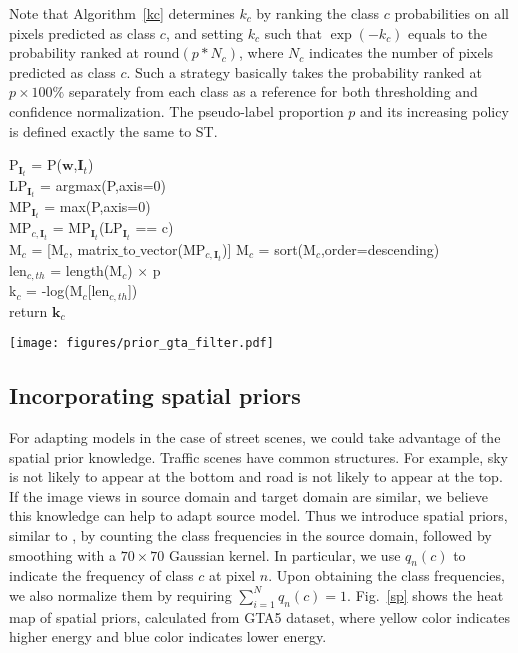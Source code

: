 \documentclass[runningheads]{llncs}
\begin{document}
Note that Algorithm~\ref{kc} determines $k_c$ by ranking the class $c$ probabilities on all pixels predicted as class $c$, and setting $k_c$ such that $\exp(-k_c)$ equals to the probability ranked at $\mathrm{round}(p*N_c)$, where $N_c$ indicates the number of pixels predicted as class $c$. Such a strategy basically takes the probability ranked at $p\times 100\%$ separately from each class as a reference for both thresholding and confidence normalization. The pseudo-label proportion $p$ and its increasing policy is defined exactly the same to ST.

\begin{algorithm}
	
	{ P$_{\textbf{I}_t}$ = P($\textbf{w}$,$\textbf{I}_t$) \\
		LP$_{\textbf{I}_t}$ = argmax(P,axis=0) \\
		MP$_{\textbf{I}_t}$ = max(P,axis=0) \\
		{
			MP$_{c,\textbf{I}_t}$ = MP$_{\textbf{I}_t}$(LP$_{\textbf{I}_t}$ == c) \\
			M$_c$ = [M$_c$, matrix$\_$to$\_$vector(MP$_{c,\textbf{I}_t}$)]
		}
	}
	{
		M$_c$ = sort(M$_c$,order=descending)\\
		len$_{c,th}$ = length(M$_c$) $\times$ p \\
		k$_c$ = -log(M$_c$[len$_{c,th}$]) \\
	}
	{
		return $\textbf{k}_c$
	}
	\caption{Determination of $k_c$ in CBST}
	\label{kc}
\end{algorithm}

\begin{figure*}[!b]
\centering
\texttt{[image: figures/prior\_gta\_filter.pdf]}
\caption{Visualization of class-wise spatial priors on GTA5.}
\label{sp}
\end{figure*}

\subsection{Incorporating spatial priors}
For adapting models in the case of street scenes, we could take advantage of the spatial prior knowledge. Traffic scenes have common structures. For example, sky is not likely to appear at the bottom and road is not likely to appear at the top. If the image views in source domain and target domain are similar, we believe this knowledge can help to adapt source model. Thus we introduce spatial priors, similar to \cite{silberman2011indoor}, by counting the class frequencies in the source domain, followed by smoothing with a $70 \times 70$ Gaussian kernel. In particular, we use $q_n(c)$ to indicate the frequency of class $c$ at pixel $n$. Upon obtaining the class frequencies, we also normalize them by requiring $\sum_{i=1}^{N}q_n(c) = 1$. Fig.~\ref{sp} shows the heat map of spatial priors, calculated from GTA5 dataset, where yellow color indicates higher energy and blue color indicates lower energy.
\end{document}
